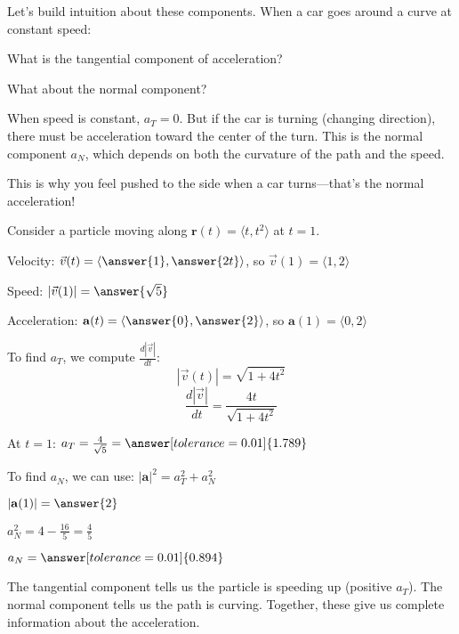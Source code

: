 \documentclass{ximera}
\begin{document}
\begin{problem}
Let's build intuition about these components. When a car goes around a curve at constant speed:

What is the tangential component of acceleration?
\begin{multipleChoice}
\end{multipleChoice}

What about the normal component?
\begin{multipleChoice}
\end{multipleChoice}

\begin{feedback}
When speed is constant, $a_T = 0$. But if the car is turning (changing direction), there must be acceleration toward the center of the turn. This is the normal component $a_N$, which depends on both the curvature of the path and the speed.

This is why you feel pushed to the side when a car turns—that's the normal acceleration!
\end{feedback}
\end{problem}

\begin{problem}
Consider a particle moving along $\mathbf{r}(t) = \langle t, t^2 \rangle$ at $t = 1$.

Velocity: $\vec{v}(t) = \langle \answer{1}, \answer{2t} \rangle$, so $\vec{v}(1) = \langle 1, 2 \rangle$

Speed: $|\vec{v}(1)| = \answer{\sqrt{5}}$

Acceleration: $\mathbf{a}(t) = \langle \answer{0}, \answer{2} \rangle$, so $\mathbf{a}(1) = \langle 0, 2 \rangle$

To find $a_T$, we compute $\frac{d|\vec{v}|}{dt}$:
\[|\vec{v}(t)| = \sqrt{1 + 4t^2}\]
\[\frac{d|\vec{v}|}{dt} = \frac{4t}{\sqrt{1+4t^2}}\]

At $t=1$: $a_T = \frac{4}{\sqrt{5}} = \answer[tolerance=0.01]{1.789}$

To find $a_N$, we can use: $|\mathbf{a}|^2 = a_T^2 + a_N^2$

$|\mathbf{a}(1)| = \answer{2}$

$a_N^2 = 4 - \frac{16}{5} = \frac{4}{5}$

$a_N = \answer[tolerance=0.01]{0.894}$

\begin{feedback}
The tangential component tells us the particle is speeding up (positive $a_T$). The normal component tells us the path is curving. Together, these give us complete information about the acceleration.
\end{feedback}
\end{problem}
\end{document}

